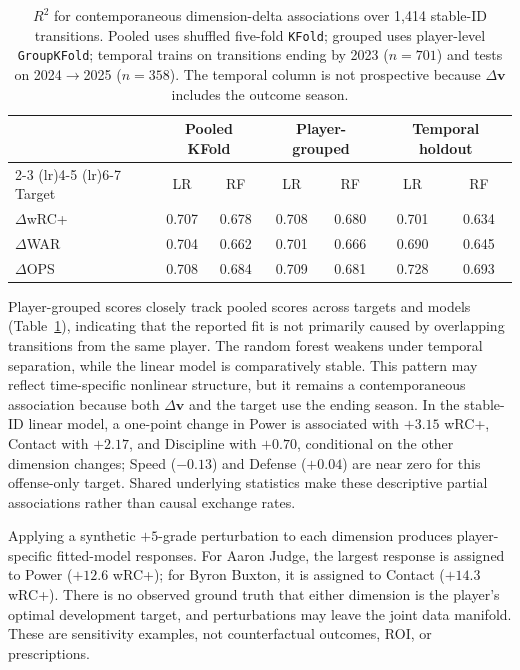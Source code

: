 \documentclass[10pt,twocolumn,letterpaper]{article}
\begin{document}
\begin{table}[t]
\centering
\caption{$R^2$ for contemporaneous dimension-delta associations over 1{,}414 stable-ID transitions. Pooled uses shuffled five-fold \texttt{KFold}; grouped uses player-level \texttt{GroupKFold}; temporal trains on transitions ending by 2023 ($n=701$) and tests on 2024$\to$2025 ($n=358$). The temporal column is not prospective because $\Delta\mathbf{v}$ includes the outcome season.}
\label{tab:cv}
\small
\begin{tabular}{lcccccc}
\toprule
 & \multicolumn{2}{c}{Pooled KFold} & \multicolumn{2}{c}{Player-grouped} & \multicolumn{2}{c}{Temporal holdout} \\
\cmidrule(lr){2-3} \cmidrule(lr){4-5} \cmidrule(lr){6-7}
Target & LR & RF & LR & RF & LR & RF \\
\midrule
$\Delta$wRC+ & 0.707 & 0.678 & 0.708 & 0.680 & 0.701 & 0.634 \\
$\Delta$WAR  & 0.704 & 0.662 & 0.701 & 0.666 & 0.690 & 0.645 \\
$\Delta$OPS  & 0.708 & 0.684 & 0.709 & 0.681 & 0.728 & 0.693 \\
\bottomrule
\end{tabular}
\end{table}

Player-grouped scores closely track pooled scores across targets and models (Table~\ref{tab:cv}), indicating that the reported fit is not primarily caused by overlapping transitions from the same player. The random forest weakens under temporal separation, while the linear model is comparatively stable. This pattern may reflect time-specific nonlinear structure, but it remains a contemporaneous association because both $\Delta\mathbf{v}$ and the target use the ending season. In the stable-ID linear model, a one-point change in Power is associated with $+3.15$ wRC+, Contact with $+2.17$, and Discipline with $+0.70$, conditional on the other dimension changes; Speed ($-0.13$) and Defense ($+0.04$) are near zero for this offense-only target. Shared underlying statistics make these descriptive partial associations rather than causal exchange rates.

Applying a synthetic $+5$-grade perturbation to each dimension produces player-specific fitted-model responses. For Aaron Judge, the largest response is assigned to Power ($+12.6$ wRC+); for Byron Buxton, it is assigned to Contact ($+14.3$ wRC+). There is no observed ground truth that either dimension is the player's optimal development target, and perturbations may leave the joint data manifold. These are sensitivity examples, not counterfactual outcomes, ROI, or prescriptions.
\end{document}
